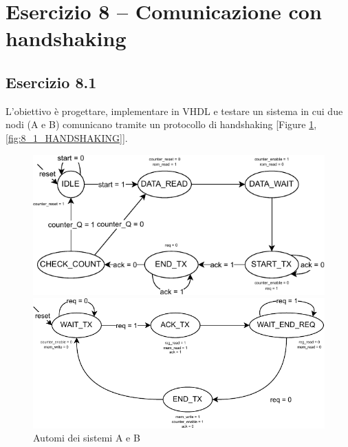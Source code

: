 \section{Esercizio 8 -- Comunicazione con handshaking}
\subsection{Esercizio 8.1}
L'obiettivo è progettare, implementare in VHDL e testare un sistema in cui due nodi (A e B) comunicano tramite un protocollo di handshaking [Figure \ref{fig:handshaking}, \ref{fig:8_1_HANDSHAKING}].

\begin{figure}[h]
    \centering
    \begin{minipage}[c]{0.45\linewidth}
        \includegraphics[width=\linewidth]{img/handshaking_A.pdf}
    \end{minipage}
    \hfill
    \begin{minipage}[c]{0.45\linewidth}
        \includegraphics[width=\linewidth]{img/handshaking_B.pdf}
    \end{minipage}
    \caption{Automi dei sistemi A e B}
    \label{fig:handshaking}
\end{figure}

